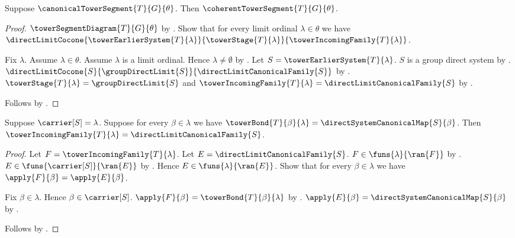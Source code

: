 \begin{theorem}\label{canonical_tower_segment_is_coherent}
    Suppose $\canonicalTowerSegment{T}{G}{\theta}$.
    Then $\coherentTowerSegment{T}{G}{\theta}$.
\end{theorem}
\begin{proof}
    $\towerSegmentDiagram{T}{G}{\theta}$ by
        .
    Show that for every limit ordinal $\lambda\in\theta$ we have
        $\directLimitCocone
            {\towerEarlierSystem{T}{\lambda}}
            {\towerStage{T}{\lambda}}
            {\towerIncomingFamily{T}{\lambda}}$.
    \begin{subproof}
        Fix $\lambda$.
        Assume $\lambda\in\theta$.
        Assume $\lambda$ is a limit ordinal.
        Hence $\lambda\neq\emptyset$ by
            .
        Let $S=\towerEarlierSystem{T}{\lambda}$.
        $S$ is a group direct system by
            .
        $\directLimitCocone
            {S}{\groupDirectLimit{S}}{\directLimitCanonicalFamily{S}}$ by
            .
        $\towerStage{T}{\lambda}=\groupDirectLimit{S}$ and
            $\towerIncomingFamily{T}{\lambda}=
                \directLimitCanonicalFamily{S}$ by
            .
    \end{subproof}
    Follows by .
\end{proof}

\begin{theorem}\label{tower_incoming_family_eq_canonical_family}
    Suppose $\carrier[S]=\lambda$.
    Suppose for every $\beta\in\lambda$ we have
        $\towerBond{T}{\beta}{\lambda}=
            \directSystemCanonicalMap{S}{\beta}$.
    Then $\towerIncomingFamily{T}{\lambda}=
        \directLimitCanonicalFamily{S}$.
\end{theorem}
\begin{proof}
    Let $F=\towerIncomingFamily{T}{\lambda}$.
    Let $E=\directLimitCanonicalFamily{S}$.
    $F\in\funs{\lambda}{\ran{F}}$ by
        .
    $E\in\funs{\carrier[S]}{\ran{E}}$ by
        .
    Hence $E\in\funs{\lambda}{\ran{E}}$.
    Show that for every $\beta\in\lambda$ we have
        $\apply{F}{\beta}=\apply{E}{\beta}$.
    \begin{subproof}
        Fix $\beta\in\lambda$.
        Hence $\beta\in\carrier[S]$.
        $\apply{F}{\beta}=\towerBond{T}{\beta}{\lambda}$ by
            .
        $\apply{E}{\beta}=\directSystemCanonicalMap{S}{\beta}$ by
            .
    \end{subproof}
    Follows by .
\end{proof}
